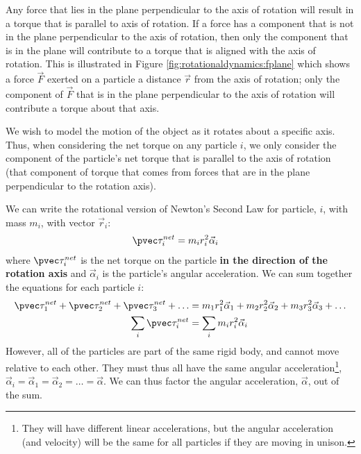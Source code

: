 Any force that lies in the plane perpendicular to the axis of rotation will result in a torque that is parallel to axis of rotation. If a force has a component that is not in the plane perpendicular to the axis of rotation, then only the component that is in the plane will contribute to a torque that is aligned with the axis of rotation. This is illustrated in Figure \ref{fig:rotationaldynamics:fplane} which shows a force $\vec F$ exerted on a particle a distance $\vec r$ from the axis of rotation; only the component of $\vec F$ that is in the plane perpendicular to the axis of rotation will contribute a torque about that axis.

We wish to model the motion of the object as it rotates about a specific axis. Thus, when considering the net torque on any particle $i$, we only consider the component of the particle's net torque that is parallel to the axis of rotation (that component of torque that comes from forces that are in the plane perpendicular to the rotation axis).

We can write the rotational version of Newton's Second Law for particle, $i$, with mass $m_i$, with vector $\vec r_i$:
\begin{align*}
\pvec\tau_i^{net} &= m_ir_i^2\vec\alpha_i
\end{align*}
where $\pvec\tau_i^{net}$ is the net torque on the particle \textbf{in the direction of the rotation axis} and $\vec\alpha_i$ is the particle's angular acceleration. We can sum together the equations for each particle $i$:
\begin{align*}
\pvec\tau_1^{net} + \pvec\tau_2^{net} +\pvec\tau_3^{net} + \dots &= m_1r_1^2\vec\alpha_1 + m_2r_2^2\vec\alpha_2 +m_3r_3^2\vec\alpha_3 +\dots\\
\sum_i \pvec\tau_i^{net} &= \sum_i  m_ir_i^2\vec\alpha_i
\end{align*}
However, all of the particles are part of the same rigid body, and cannot move relative to each other. They must thus all have the same angular acceleration\footnote{They will have different linear accelerations, but the angular acceleration (and velocity) will be the same for all particles if they are moving in unison.}, $\vec\alpha_i = \vec \alpha_1 = \vec \alpha_2 =\dots=\vec\alpha$. We can thus factor the angular acceleration, $\vec \alpha$, out of the sum.

